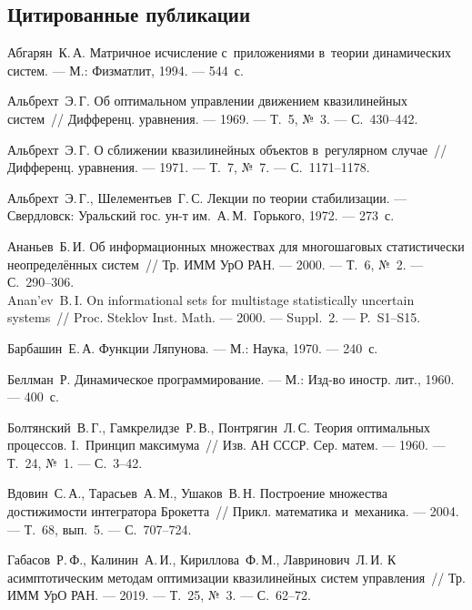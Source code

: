 \documentclass[../main.tex]{subfiles}
\begin{document}
\clearpage
\begin{thebibliography}{99}

\subsection*{Цитированные публикации}

Абгарян~К.\,А. Матричное исчисление с~приложениями в~теории динамических систем. --- М.: Физматлит, 1994. --- 544~с.

Альбрехт~Э.\,Г. Об оптимальном управлении движением квазилинейных систем~// Дифференц. уравнения. --- 1969. --- Т.~5, №~3. --- С.~430--442.

Альбрехт~Э.\,Г. О сближении квазилинейных объектов в~регулярном случае~// Дифференц. уравнения. --- 1971. --- Т.~7, №~7. --- С.~1171--1178.

Альбрехт~Э.\,Г., Шелементьев~Г.\,С. Лекции по теории стабилизации. --- Свердловск: Уральский гос. ун-т им.~А.\,М.~Горького, 1972. --- 273~с.

Ананьев~Б.\,И. Об информационных множествах для многошаговых статистически неопределённых систем~// Тр. ИММ УрО РАН. --- 2000. --- Т.~6, №~2. --- С.~290--306.  \\
Anan'ev~B.\,I. On informational sets for multistage statistically uncertain systems~// Proc. Steklov Inst. Math. --- 2000. --- Suppl.~2. --- P.~S1--S15.


Барбашин~Е.\,А. Функции Ляпунова. --- М.: Наука, 1970. --- 240~с.

Беллман~Р. Динамическое программирование. --- М.: Изд-во иностр. лит., 1960. --- 400~с.

Болтянский~В.\,Г., Гамкрелидзе~Р.\,В., Понтрягин~Л.\,С. Теория оптимальных процессов. I.~Принцип максимума~// Изв. АН СССР. Сер. матем. --- 1960. --- Т.~24, №~1. --- С.~3--42.

Вдовин~С.\,А., Тарасьев~А.\,М., Ушаков~В.\,Н. Построение множества достижимости интегратора Брокетта~// Прикл. математика и~механика. --- 2004. --- Т.~68, вып.~5. --- С.~707--724.

Габасов~Р.\,Ф., Калинин~А.\,И., Кириллова~Ф.\,М., Лавринович~Л.\,И. К асимптотическим методам оптимизации квазилинейных систем управления~// Тр. ИММ УрО РАН. --- 2019. --- Т.~25, №~3. --- С.~62--72.


\end{thebibliography}
\end{document}
